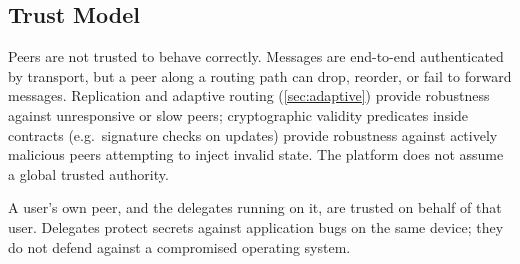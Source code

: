 \subsection{Trust Model}

Peers are not trusted to behave correctly. Messages are end-to-end authenticated by transport, but a peer along a routing path can drop, reorder, or fail to forward messages. Replication and adaptive routing (\cref{sec:adaptive}) provide robustness against unresponsive or slow peers; cryptographic validity predicates inside contracts (e.g.\ signature checks on updates) provide robustness against actively malicious peers attempting to inject invalid state. The platform does not assume a global trusted authority.

A user's own peer, and the delegates running on it, are trusted on behalf of that user. Delegates protect secrets against application bugs on the same device; they do not defend against a compromised operating system.
